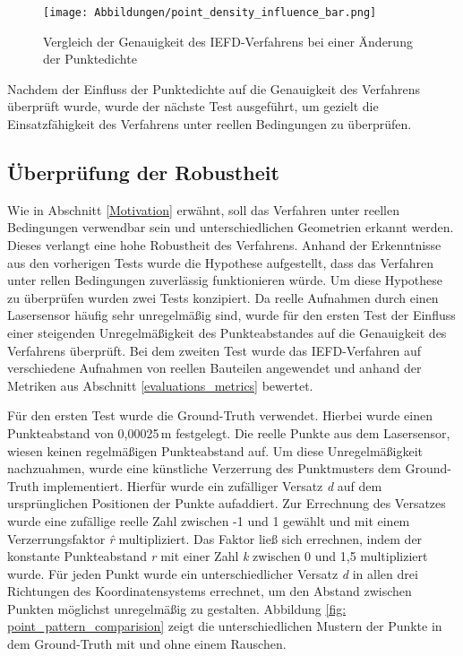 \begin{figure}[t]
	\texttt{[image: Abbildungen/point\_density\_influence\_bar.png]}
	\centering
	\caption{Vergleich der Genauigkeit des IEFD-Verfahrens bei einer Änderung der Punktedichte}
	\label{fig: point_density_bar_chart}
\end{figure}

Nachdem der Einfluss der Punktedichte auf die Genauigkeit des Verfahrens überprüft wurde, wurde der nächste Test ausgeführt, um gezielt die Einsatzfähigkeit des Verfahrens unter reellen Bedingungen zu überprüfen.

\subsection{Überprüfung der Robustheit} \label{test_3}
Wie in Abschnitt \ref{Motivation} erwähnt, soll das Verfahren unter reellen Bedingungen verwendbar sein und unterschiedlichen Geometrien erkannt werden. Dieses verlangt eine hohe Robustheit des Verfahrens. Anhand der Erkenntnisse aus den vorherigen Tests wurde die Hypothese aufgestellt, dass das Verfahren unter rellen Bedingungen zuverlässig funktionieren würde. Um diese Hypothese zu überprüfen wurden zwei Tests konzipiert. Da reelle Aufnahmen durch einen Lasersensor häufig sehr unregelmäßig sind, wurde für den ersten Test der Einfluss einer steigenden Unregelmäßigkeit des Punkteabstandes auf die Genauigkeit des Verfahrens überprüft. Bei dem zweiten Test wurde das IEFD-Verfahren auf verschiedene Aufnahmen von reellen Bauteilen angewendet und anhand der Metriken aus Abschnitt \ref{evaluations_metrics} bewertet.

Für den ersten Test wurde die Ground-Truth verwendet. Hierbei wurde einen Punkteabstand von 0,00025\,\si{\m} festgelegt. Die reelle Punkte aus dem Lasersensor, wiesen keinen regelmäßigen Punkteabstand auf. Um diese Unregelmäßigkeit nachzuahmen, wurde eine künstliche Verzerrung des Punktmusters dem Ground-Truth implementiert. Hierfür wurde ein zufälliger Versatz \textit{d} auf dem ursprünglichen Positionen der Punkte aufaddiert. Zur Errechnung des Versatzes wurde eine zufällige reelle Zahl zwischen -1 und 1 gewählt und mit einem Verzerrungsfaktor \textit{\^{r}} multipliziert. Das Faktor ließ sich errechnen, indem der konstante Punkteabstand \textit{r} mit einer Zahl \textit{k} zwischen 0 und 1,5 multipliziert wurde. Für jeden Punkt wurde ein unterschiedlicher Versatz \textit{d} in allen drei Richtungen des Koordinatensystems errechnet, um den Abstand zwischen Punkten möglichst unregelmäßig zu gestalten. Abbildung \ref{fig: point_pattern_comparision} zeigt die unterschiedlichen Mustern der Punkte in dem Ground-Truth mit und ohne einem Rauschen. 

